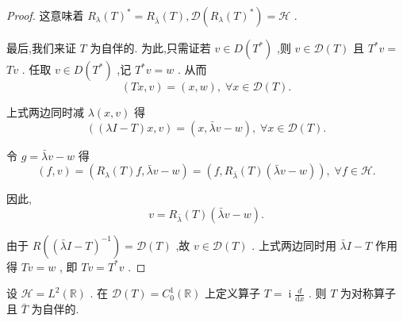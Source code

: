 \documentclass[lang=cn,newtx,10pt,scheme=chinese,thmcnt=chapter]{elegantbook}
\newcommand{\dif}{\mathrm{d}}
\newcommand{\ci}{\operatorname{i}}
\begin{document}
\begin{proof}
这意味着 \({R}_{\lambda }{\left( T\right) }^{ * } = {R}_{\bar{\lambda }}\left( T\right),\mathcal{D}(R_\lambda(T)^*)=\mathcal{H}\) .

最后,我们来证 \(T\) 为自伴的. 为此,只需证若 \(v \in  D\left( {T}^{ * }\right)\) ,则 \(v \in  \mathcal{D}(T)\) 且 \({T}^{ * }v =\)  \({Tv}\) . 任取 \(v \in  D\left( {T}^{ * }\right)\) ,记 \({T}^{ * }v = w\) . 从而
\begin{equation*}
\left( {{Tx},v}\right)  = \left( {x,w}\right) ,\;\forall x \in  \mathcal{D}(T) .
\end{equation*}

上式两边同时减 \(\lambda \left( {x,v}\right)\) 得
\begin{equation*}
\left( {\left( {{\lambda I} - T}\right) x,v}\right)  = \left( {x,\bar{\lambda }v - w}\right) ,\;\forall x \in  \mathcal{D}(T) .
\end{equation*}

令 \(g = \bar{\lambda }v - w\) 得
\begin{equation*}
\left( {f,v}\right)  = \left( {{R}_{\lambda }\left( T\right) f,\bar{\lambda }v - w}\right)  = \left( {f,{R}_{\bar{\lambda }}\left( T\right) \left( {\bar{\lambda }v - w}\right) }\right) ,\;\forall f \in  \mathcal{H}.
\end{equation*}

因此,
\begin{equation*}
v = {R}_{\bar{\lambda }}\left( T\right) \left( {\bar{\lambda }v - w}\right) .
\end{equation*}

由于 \(R\left( {\left( \bar{\lambda }I - T\right) }^{-1}\right)  = \mathcal{D}(T)\) ,故 \(v \in  \mathcal{D}(T)\) . 上式两边同时用 \(\bar{\lambda }I - T\) 作用得 \({Tv} = w\) , 即 \({Tv} = {T}^{ * }v\) .

\end{proof}
\begin{example}
    设 \(\mathcal{H} = {L}^{2}\left( \mathbb{R}\right)\) . 在 \(\mathcal{D}(T)  = {C}_{0}^{1}\left( \mathbb{R}\right)\) 上定义算子 \(T = \ci\frac{d}{\dif x}\) . 则 \(T\) 为对称算子且 \(\bar{T}\) 为自伴的.
\end{example}
\end{document}
